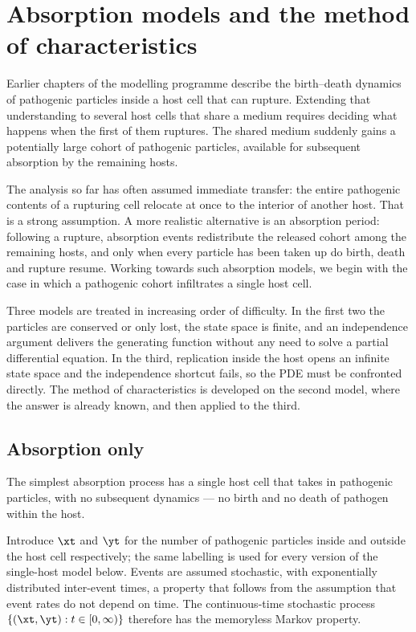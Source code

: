 \section{Absorption models and the method of characteristics}
\label{sec:moc}

Earlier chapters of the modelling programme describe the birth--death dynamics of
pathogenic particles inside a host cell that can rupture. Extending that understanding
to several host cells that share a medium requires deciding what happens when the first
of them ruptures. The shared medium suddenly gains a potentially large cohort of
pathogenic particles, available for subsequent absorption by the remaining hosts.

The analysis so far has often assumed immediate transfer: the entire pathogenic contents
of a rupturing cell relocate at once to the interior of another host. That is a strong
assumption. A more realistic alternative is an absorption period: following a rupture,
absorption events redistribute the released cohort among the remaining hosts, and only
when every particle has been taken up do birth, death and rupture resume. Working
towards such absorption models, we begin with the case in which a pathogenic cohort
infiltrates a single host cell.

Three models are treated in increasing order of difficulty. In the first two the
particles are conserved or only lost, the state space is finite, and an independence
argument delivers the generating function without any need to solve a partial
differential equation. In the third, replication inside the host opens an infinite state
space and the independence shortcut fails, so the PDE must be confronted directly. The
method of characteristics is developed on the second model, where the answer is already
known, and then applied to the third.

\subsection{Absorption only}
\label{sec:absonly}

The simplest absorption process has a single host cell that takes in pathogenic
particles, with no subsequent dynamics --- no birth and no death of pathogen within the
host.

Introduce $\xt$ and $\yt$ for the number of pathogenic particles inside and outside the
host cell respectively; the same labelling is used for every version of the single-host
model below. Events are assumed stochastic, with exponentially distributed inter-event
times, a property that follows from the assumption that event rates do not depend on
time. The continuous-time stochastic process $\{(\xt,\yt) : t\in[0,\infty)\}$ therefore
has the memoryless Markov property.

